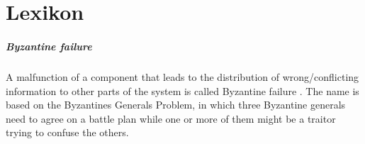 
\cleardoublepage
\chapter{Lexikon}
\label{app:dic}

\paragraph*{Byzantine failure} A malfunction of a component that leads to the distribution of wrong/conflicting information to other parts of the system is called Byzantine failure . The name is based on the Byzantines Generals Problem, in which three Byzantine generals need to agree on a battle plan while one or more of them might be a traitor trying to confuse the others.
